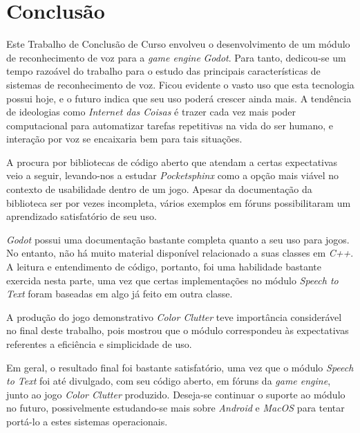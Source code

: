 \chapter{Conclusão}
\label{cap:conclusion}

Este Trabalho de Conclusão de Curso envolveu o desenvolvimento de um módulo de reconhecimento de voz para a \textit{game engine} \textit{Godot}. Para tanto, dedicou-se um tempo razoável do trabalho para o estudo das principais características de sistemas de reconhecimento de voz. Ficou evidente o vasto uso que esta tecnologia possui hoje, e o futuro indica que seu uso poderá crescer ainda mais. A tendência de ideologias como \emph{Internet das Coisas} é trazer cada vez mais poder computacional para automatizar tarefas repetitivas na vida do ser humano, e interação por voz se encaixaria bem para tais situações.

A procura por bibliotecas de código aberto que atendam a certas expectativas veio a seguir, levando-nos a estudar \textit{Pocketsphinx} como a opção mais viável no contexto de usabilidade dentro de um jogo. Apesar da documentação da biblioteca ser por vezes incompleta, vários exemplos em fóruns possibilitaram um aprendizado satisfatório de seu uso.

\textit{Godot} possui uma documentação bastante completa quanto a seu uso para jogos. No entanto, não há muito material disponível relacionado a suas classes em \textit{C++}. A leitura e entendimento de código, portanto, foi uma habilidade bastante exercida nesta parte, uma vez que certas implementações no módulo \textit{Speech to Text} foram baseadas em algo já feito em outra classe.

A produção do jogo demonstrativo \textit{Color Clutter} teve importância considerável no final deste trabalho, pois mostrou que o módulo correspondeu às expectativas referentes a eficiência e simplicidade de uso.

Em geral, o resultado final foi bastante satisfatório, uma vez que o módulo \textit{Speech to Text} foi até divulgado, com seu código aberto, em fóruns da \textit{game engine}, junto ao jogo \textit{Color Clutter} produzido. Deseja-se continuar o suporte ao módulo no futuro, possivelmente estudando-se mais sobre \textit{Android} e \textit{MacOS} para tentar portá-lo a estes sistemas operacionais.
